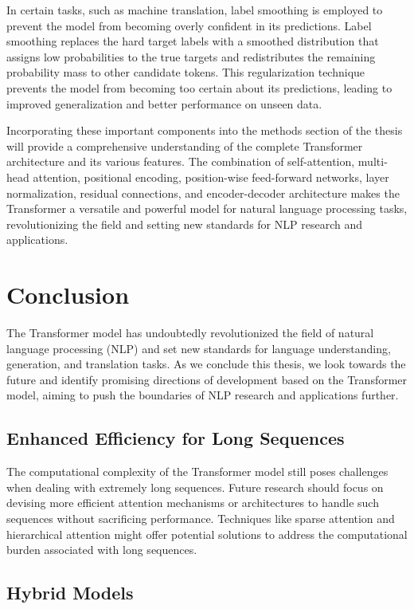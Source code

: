 \documentclass{article}
\begin{document}
In certain tasks, such as machine translation, label smoothing is employed to prevent the model from becoming overly confident in its predictions. Label smoothing replaces the hard target labels with a smoothed distribution that assigns low probabilities to the true targets and redistributes the remaining probability mass to other candidate tokens. This regularization technique prevents the model from becoming too certain about its predictions, leading to improved generalization and better performance on unseen data.

Incorporating these important components into the methods section of the thesis will provide a comprehensive understanding of the complete Transformer architecture and its various features. The combination of self-attention, multi-head attention, positional encoding, position-wise feed-forward networks, layer normalization, residual connections, and encoder-decoder architecture makes the Transformer a versatile and powerful model for natural language processing tasks, revolutionizing the field and setting new standards for NLP research and applications.


\section{Conclusion}


The Transformer model has undoubtedly revolutionized the field of natural language processing (NLP) and set new standards for language understanding, generation, and translation tasks. As we conclude this thesis, we look towards the future and identify promising directions of development based on the Transformer model, aiming to push the boundaries of NLP research and applications further.

\subsection{Enhanced Efficiency for Long Sequences}

The computational complexity of the Transformer model still poses challenges when dealing with extremely long sequences. Future research should focus on devising more efficient attention mechanisms or architectures to handle such sequences without sacrificing performance. Techniques like sparse attention and hierarchical attention might offer potential solutions to address the computational burden associated with long sequences.

\subsection{Hybrid Models}
\end{document}

